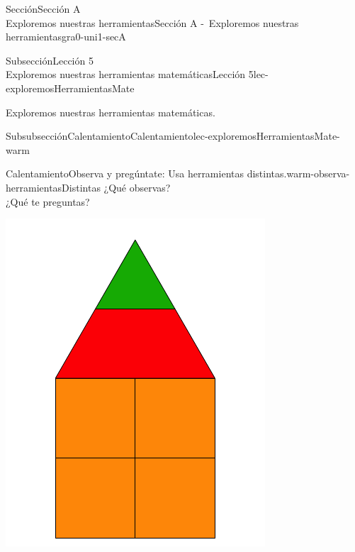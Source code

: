 \begin{sectionptx}{Sección}{{\Large Sección A\\}Exploremos nuestras herramientas}{}{Sección A -~Exploremos nuestras herramientas}{}{}{gra0-uni1-secA}
\begin{subsectionptx}{Subsección}{{\normalsize Lección 5\\[-0.05cm]}Exploremos nuestras herramientas matemáticas}{}{Lección 5}{}{}{lec-exploremosHerramientasMate}
\begin{introduction}{}%
Exploremos nuestras herramientas matemáticas.%
\end{introduction}%
%
%
\typeout{************************************************}
\typeout{************************************************}
%
\begin{subsubsectionptx}{Subsubsección}{Calentamiento}{}{Calentamiento}{}{}{lec-exploremosHerramientasMate-warm}
\begin{exploration}{Calentamiento}{Observa y pregúntate: Usa herramientas distintas.}{warm-observa-herramientasDistintas}%
¿Qué observas?\\
 ¿Qué te preguntas?%
\begin{sidebyside}{2}{0.05}{0.05}{0.1}%
\begin{sbspanel}{0.4}%
\includegraphics[max width=\linewidth, center]{external/svg-source/tikz-file-148145.pdf}
\end{sbspanel}%
\begin{sbspanel}{0.4}%

\end{sbspanel}
\end{sidebyside}
\end{exploration}
\end{subsubsectionptx}
\end{subsectionptx}
\end{sectionptx}

